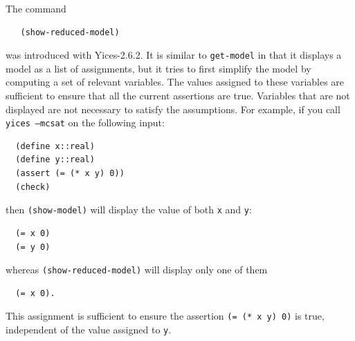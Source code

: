 \documentclass[11pt,twoside,fleqn,openright,titlepage]{cslreport}
\begin{document}
\medskip\noindent
The command
\begin{small}
\begin{verbatim}
   (show-reduced-model)
\end{verbatim}
\end{small}
was introduced with Yices-2.6.2. It is similar to \texttt{get-model}
in that it displays a model as a list of assignments, but it tries to
first simplify the model by computing a set of relevant variables.
The values assigned to these variables are sufficient to ensure that
all the current assertions are true. Variables that are not displayed
are not necessary to satisfy the assumptions. For example, if you call
\texttt{yices --mcsat}
on the following input:
\begin{small}
\begin{verbatim}
  (define x::real)
  (define y::real)
  (assert (= (* x y) 0))
  (check)
\end{verbatim}
\end{small}
then \texttt{(show-model)} will display the value of both \texttt{x} and \texttt{y}:
\begin{small}
\begin{verbatim}
  (= x 0)
  (= y 0)
\end{verbatim}
\end{small}
whereas \texttt{(show-reduced-model)} will display only one of them
\begin{small}
\begin{verbatim}
  (= x 0).
\end{verbatim}
\end{small}
This assignment is sufficient to ensure the assertion \texttt{(= (* x
  y) 0)} is true, independent of the value assigned to \texttt{y}.
\end{document}
